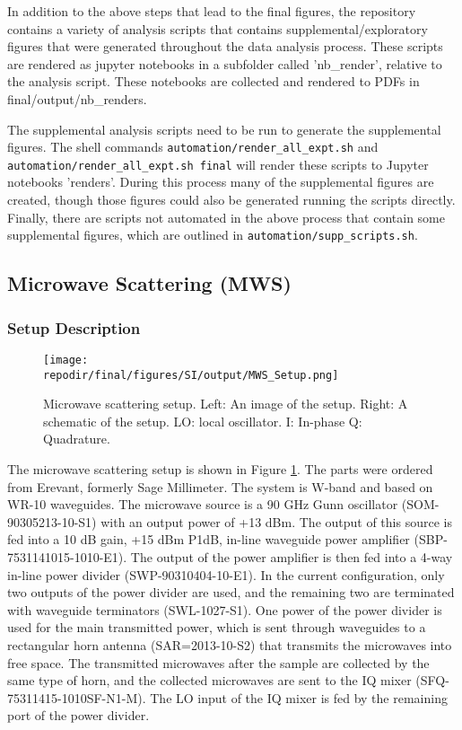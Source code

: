 In addition to the above steps that lead to the final figures, the repository contains a variety of analysis scripts that contains supplemental/exploratory figures that were generated throughout the data analysis process. These scripts are rendered as jupyter notebooks in a subfolder called 'nb\_render', relative to the analysis script. These notebooks are collected and rendered to PDFs in final/output/nb\_renders. 

The supplemental analysis scripts need to be run to generate the supplemental figures. The shell commands \texttt{automation/render\_all\_expt.sh} and \texttt{automation/render\_all\_expt.sh final} will render these scripts to Jupyter notebooks 'renders'. During this process many of the supplemental figures are created, though those figures could also be generated running the scripts directly. Finally, there are scripts not automated in the above process that contain some supplemental figures, which are outlined in \texttt{automation/supp\_scripts.sh}. 

\clearpage
\subsection{Microwave Scattering (MWS) }


\subsubsection{Setup Description}
\begin{figure}[]
\centering
\texttt{[image: \\repodir/final/figures/SI/output/MWS\_Setup.png]}
\caption{Microwave scattering setup. Left: An image of the setup. Right: A schematic of the setup. LO: local oscillator. I: In-phase Q: Quadrature.  }
\label{fig:SI_MWS_Setup}
\end{figure}

The microwave scattering setup is shown in Figure \ref{fig:SI_MWS_Setup}. The parts were ordered from Erevant, formerly Sage Millimeter. The system is W-band and based on WR-10 waveguides. The microwave source is a 90 GHz Gunn oscillator (SOM-90305213-10-S1) with an output power of +13 dBm. The output of this source is fed into a 10 dB gain, +15 dBm P1dB, in-line waveguide power amplifier (SBP-7531141015-1010-E1). The output of the power amplifier is then fed into a 4-way in-line power divider (SWP-90310404-10-E1). In the current configuration, only two outputs of the power divider are used, and the remaining two are terminated with waveguide terminators (SWL-1027-S1). One power of the power divider is used for the main transmitted power, which is sent through waveguides to a rectangular horn antenna (SAR=2013-10-S2) that transmits the microwaves into free space. The transmitted microwaves after the sample are collected by the same type of horn, and the collected microwaves are sent to the IQ mixer (SFQ-75311415-1010SF-N1-M). The LO input of the IQ mixer is fed by the remaining port of the power divider. 

